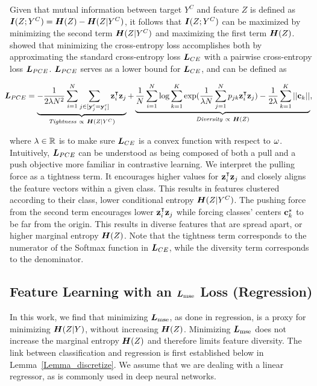 \documentclass{article} %
\begin{document}
Given that mutual information between target $Y^C$ and feature $Z$ is defined as ${\bm{I}}(Z; Y^C)={\bm{H}}(Z)-{\bm{H}}(Z|Y^C)$, it follows that ${\bm{I}}(Z; Y^C)$ can be maximized by minimizing the second term ${\bm{H}}(Z|Y^C)$ and maximizing the first term ${\bm{H}}(Z)$. \citet{boudiaf2020unifying} showed that minimizing the cross-entropy loss accomplishes both 
by approximating the standard cross-entropy loss ${\bm{L}}_{CE}$ with a pairwise cross-entropy loss ${\bm{L}}_{PCE}$.  ${\bm{L}}_{PCE}$ serves as a lower bound for ${\bm{L}}_{CE}$, and can be defined as 

\begin{equation}
    \!\!\!\!{\bm{L}}_{PCE} = \underbrace{- \frac {1}{2\lambda N^{2}}  \sum^N_{i=1} \sum_{j\in [{\bf y}^c_j={\bf y}^c_i]}{\bf z}_{i}^{\intercal}{\bf z}_{j}}_{\textit{Tightness}~\propto~{\bm{H}}(Z|Y^C)}  +  \underbrace{\frac{1}{N}\sum^N_{i=1}\log\sum^K_{k=1}\exp(\frac{1}{\lambda N}\sum_{j=1}^Np_{jk}{\bf z}_{i}^{\intercal}{\bf z}_{j})-\frac{1}{2\lambda}\sum_{k=1}^K||{\bf c}_k||}_{\textit{Diversity}~\propto~{\bm{H}}(Z)},
    \label{eq:pce_reformulated}
\end{equation}

where 
$\lambda \in {\mathbb R}$ is to make sure  ${\bm{L}}_{CE}$ is a convex function with respect to ${\omega}$.
Intuitively, ${\bm{L}}_{PCE}$ can be understood as being composed of both a pull and a push objective more familiar in contrastive learning. We interpret the pulling force as a tightness term.  It encourages higher values for ${\bf z}_i^{\intercal}{\bf z}_j$ and closely aligns the feature vectors within a given class. This results in features clustered according to their class, \ie lower conditional entropy ${\bm{H}}(Z|Y^C)$.  The pushing force from the second term encourages lower ${\bf z}_i^{\intercal}{\bf z}_j$ while forcing classes' centers ${\bf c}_k^s$ to be far from the origin.  This results in diverse features that are spread apart, or higher marginal entropy ${\bm{H}}(Z)$. Note that the tightness term corresponds to the numerator of the Softmax function in ${\bm{L}}_{CE}$, while the diversity term corresponds to the denominator. 

\subsection{Feature Learning with an ${\bm{L}}_{\text{mse}}$ Loss (Regression)} 

In this work, we find that minimizing ${\bm{L}}_{\text{mse}}$, as done in regression, is a proxy for minimizing ${\bm{H}}(Z|Y)$, without increasing ${\bm{H}}(Z)$.  Minimizing ${\bm{L}}_{\text{mse}}$ does not increase the marginal entropy ${\bm{H}}(Z)$ and therefore limits feature diversity. The link between classification and regression is first established below in Lemma~\ref{Lemma_discretize}.  We assume that we are dealing with a linear regressor, as is commonly used in deep neural networks.
\end{document}
